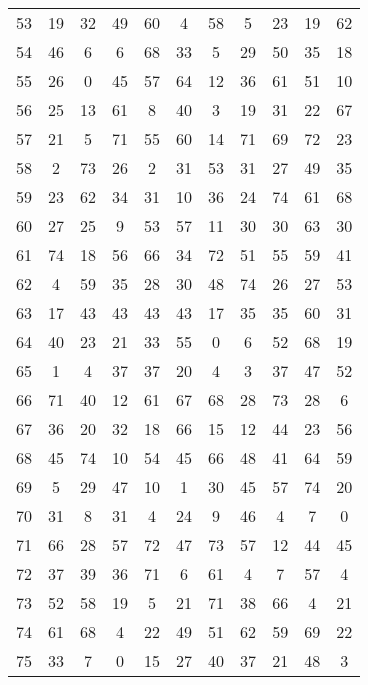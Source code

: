 \begin{table}
\begin{tabular}{c c c c c c c c c c c }
53 & 19 & 32 & 49 & 60 & 4 & 58 & 5 & 23 & 19 & 62 \\
54 & 46 & 6 & 6 & 68 & 33 & 5 & 29 & 50 & 35 & 18 \\
55 & 26 & 0 & 45 & 57 & 64 & 12 & 36 & 61 & 51 & 10 \\
56 & 25 & 13 & 61 & 8 & 40 & 3 & 19 & 31 & 22 & 67 \\
57 & 21 & 5 & 71 & 55 & 60 & 14 & 71 & 69 & 72 & 23 \\
58 & 2 & 73 & 26 & 2 & 31 & 53 & 31 & 27 & 49 & 35 \\
59 & 23 & 62 & 34 & 31 & 10 & 36 & 24 & 74 & 61 & 68 \\
60 & 27 & 25 & 9 & 53 & 57 & 11 & 30 & 30 & 63 & 30 \\
61 & 74 & 18 & 56 & 66 & 34 & 72 & 51 & 55 & 59 & 41 \\
62 & 4 & 59 & 35 & 28 & 30 & 48 & 74 & 26 & 27 & 53 \\
63 & 17 & 43 & 43 & 43 & 43 & 17 & 35 & 35 & 60 & 31 \\
64 & 40 & 23 & 21 & 33 & 55 & 0 & 6 & 52 & 68 & 19 \\
65 & 1 & 4 & 37 & 37 & 20 & 4 & 3 & 37 & 47 & 52 \\
66 & 71 & 40 & 12 & 61 & 67 & 68 & 28 & 73 & 28 & 6 \\
67 & 36 & 20 & 32 & 18 & 66 & 15 & 12 & 44 & 23 & 56 \\
68 & 45 & 74 & 10 & 54 & 45 & 66 & 48 & 41 & 64 & 59 \\
69 & 5 & 29 & 47 & 10 & 1 & 30 & 45 & 57 & 74 & 20 \\
70 & 31 & 8 & 31 & 4 & 24 & 9 & 46 & 4 & 7 & 0 \\
71 & 66 & 28 & 57 & 72 & 47 & 73 & 57 & 12 & 44 & 45 \\
72 & 37 & 39 & 36 & 71 & 6 & 61 & 4 & 7 & 57 & 4 \\
73 & 52 & 58 & 19 & 5 & 21 & 71 & 38 & 66 & 4 & 21 \\
74 & 61 & 68 & 4 & 22 & 49 & 51 & 62 & 59 & 69 & 22 \\
75 & 33 & 7 & 0 & 15 & 27 & 40 & 37 & 21 & 48 & 3 \\
\hline
\end{tabular}
\end{table}